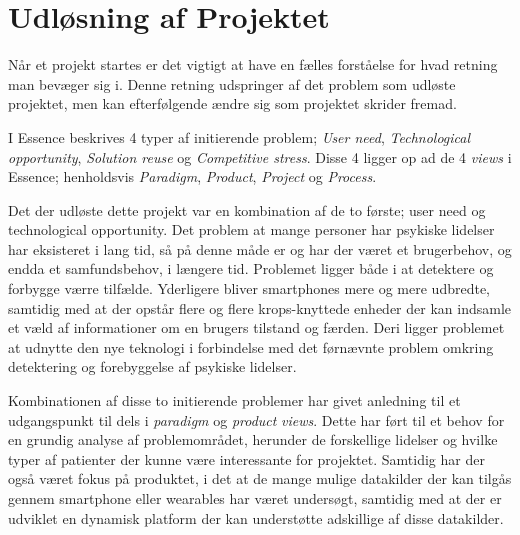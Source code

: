 \section{Udløsning af Projektet}
Når et projekt startes er det vigtigt at have en fælles forståelse for hvad retning man bevæger sig i.
Denne retning udspringer af det problem som udløste projektet, men kan efterfølgende ændre sig som projektet skrider fremad.

I Essence beskrives 4 typer af initierende problem; \textit{User need}, \textit{Technological opportunity}, \textit{Solution reuse} og \textit{Competitive stress}.
Disse 4 ligger op ad de 4 \textit{views} i Essence; henholdsvis \textit{Paradigm}, \textit{Product}, \textit{Project} og \textit{Process}.

Det der udløste dette projekt var en kombination af de to første; user need og technological opportunity.
Det problem at mange personer har psykiske lidelser har eksisteret i lang tid, så på denne måde er og har der været et brugerbehov, og endda et samfundsbehov, i længere tid.
Problemet ligger både i at detektere og forbygge værre tilfælde.
Yderligere bliver smartphones mere og mere udbredte, samtidig med at der opstår flere og flere krops-knyttede enheder der kan indsamle et væld af informationer om en brugers tilstand og færden.
Deri ligger problemet at udnytte den nye teknologi i forbindelse med det førnævnte problem omkring detektering og forebyggelse af psykiske lidelser.

Kombinationen af disse to initierende problemer har givet anledning til et udgangspunkt til dels i \textit{paradigm} og \textit{product} \textit{views}.
Dette har ført til et behov for en grundig analyse af problemområdet, herunder de forskellige lidelser og hvilke typer af patienter der kunne være interessante for projektet.
Samtidig har der også været fokus på produktet, i det at de mange mulige datakilder der kan tilgås gennem smartphone eller wearables har været undersøgt, samtidig med at der er udviklet en dynamisk platform der kan understøtte adskillige af disse datakilder.
